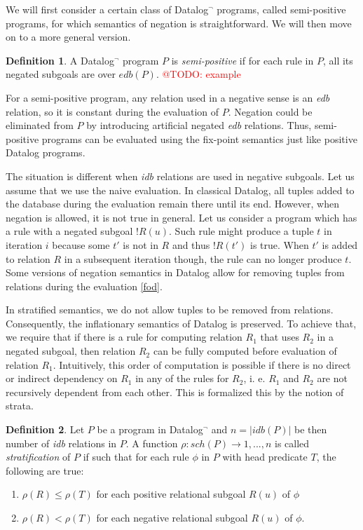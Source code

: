 \documentclass{pracamgr}
\makeatletter
\theoremstyle{plain}
\theoremstyle{definition}
\newtheorem{defn}{Definition}[section]
\theoremstyle{remark}
\newcommand{\todo}[1]{\textcolor{red}{@TODO: #1}}
\newcommand{\datalogneg}{Datalog$^{\neg}$ }
\makeatother
\begin{document}
We will first consider a certain class of \datalogneg programs, called semi-positive programs, for which semantics of negation is straightforward. We will then move on to a more general version.

\begin{defn}
A \datalogneg program $P$ is \emph{semi-positive} if for each rule in $P$, all its negated subgoals are over $edb(P)$.
\todo{example}
\end{defn}

For a semi-positive program, any relation used in a negative sense is an \emph{edb} relation, so it is constant during the evaluation of $P$. Negation could be eliminated from $P$ by introducing artificial negated \emph{edb} relations. Thus, semi-positive programs can be evaluated using the fix-point semantics just like positive Datalog programs.

The situation is different when \emph{idb} relations are used in negative subgoals. Let us assume that we use the naive evaluation. In classical Datalog, all tuples added to the database during the evaluation remain there until its end. However, when negation is allowed, it is not true in general. Let us consider a program which has a rule with a negated subgoal $!R(u)$. Such rule might produce a tuple $t$ in iteration $i$ because some $t'$ is not in $R$ and thus $!R(t')$ is true. When $t'$ is added to relation $R$ in a subsequent iteration though, the rule can no longer produce $t$. Some versions of negation semantics in Datalog allow for removing tuples from relations during the evaluation \ref{fod}.

In stratified semantics, we do not allow tuples to be removed from relations. Consequently, the inflationary semantics of Datalog is preserved. To achieve that, we require that if there is a rule for computing relation $R_1$ that uses $R_2$ in a negated subgoal, then relation $R_2$ can be fully computed before evaluation of relation $R_1$. Intuitively, this order of computation is possible if there is no direct or indirect dependency on $R_1$ in any of the rules for $R_2$, i. e. $R_1$ and $R_2$ are not recursively dependent from each other. This is formalized this by the notion of strata.

\begin{defn}
Let $P$ be a program in \datalogneg and $n = |idb(P)|$ be then number of \emph{idb} relations in $P$. A function $\rho : sch(P) \to {1, . . . , n}$ is called \emph{stratification} of $P$ if such that for each rule $\phi$ in $P$ with head predicate $T$, the following are true: 

\begin{enumerate}
\item $\rho(R) \le \rho(T)$ for each positive relational subgoal $R(u)$ of $\phi$
\item $\rho(R) < \rho(T)$ for each negative relational subgoal $R(u)$ of $\phi$.
\end{enumerate}
\end{defn}
\end{document}
